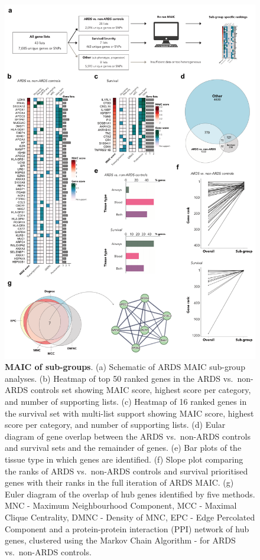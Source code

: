 \documentclass[
  11,
  a4paper,
]{article}
\begin{document}
\begin{figure}

{\centering \includegraphics{./img/Figure_3.png}

}

\caption{\label{fig-fig3}\textbf{MAIC of sub-groups}. (a) Schematic of
ARDS MAIC sub-group analyses. (b) Heatmap of top 50 ranked genes in the
ARDS vs.~non-ARDS controls set showing MAIC score, highest score per
category, and number of supporting lists. (c) Heatmap of 16 ranked genes
in the survival set with multi-list support showing MAIC score, highest
score per category, and number of supporting lists. (d) Eular diagram of
gene overlap between the ARDS vs.~non-ARDS controls and survival sets
and the remainder of genes. (e) Bar plots of the tissue type in which
genes are identified. (f) Slope plot comparing the ranks of ARDS
vs.~non-ARDS controls and survival prioritised genes with their ranks in
the full iteration of ARDS MAIC. (g) Euler diagram of the overlap of hub
genes identified by five methods. MNC - Maximum Neighbourhood Component,
MCC - Maximal Clique Centrality, DMNC - Density of MNC, EPC - Edge
Percolated Component and a protein-protein interaction (PPI) network of
hub genes, clustered using the Markov Chain Algorithm - for ARDS
vs.~non-ARDS controls.}

\end{figure}
\end{document}
